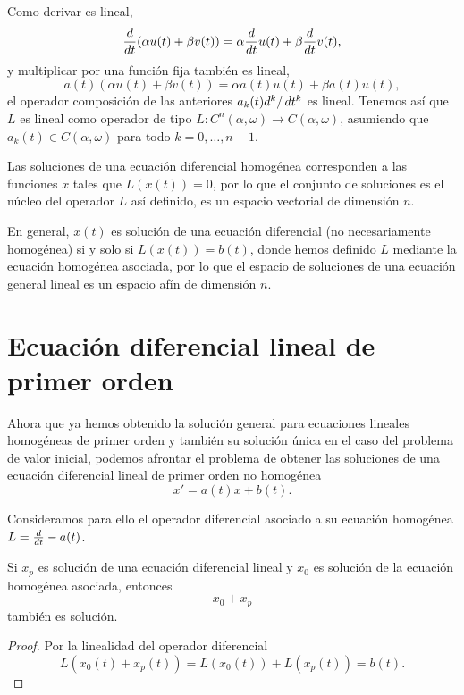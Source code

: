 \documentclass[../ecuaciones_diferenciales.tex]{subfiles}
\begin{document}
Como derivar es lineal,
\[\frac{d}{\mathop{d\!} t} (\alpha u(t) + \beta v(t))
	= \alpha \frac{d}{\mathop{d\!} t} u(t) + \beta \frac{d}{\mathop{d\!} t} v(t),\]
y multiplicar por una función fija también es lineal,
\[a(t)(\alpha u(t) + \beta v(t)) = \alpha a(t) u(t) + \beta a(t) u(t),\]
el operador composición de las anteriores \(a_k(t) d^k/\mathop{d\!} t^k\) es
lineal. Tenemos así que \(L\) es lineal como operador de tipo
\(L : C^n(\alpha, \omega) \to C(\alpha, \omega)\), asumiendo que
\(a_k(t) \in C(\alpha, \omega)\) para todo \(k=0, \dots, n-1\).

\begin{remark}
	Las soluciones de una ecuación diferencial homogénea corresponden a las
    funciones \(x\) tales que \(L(x(t)) = 0\), por lo que el conjunto de
    soluciones es el núcleo del operador \(L\) así definido, es un espacio
    vectorial de dimensión \(n\).
\end{remark}

\begin{remark}
	En general, \(x(t)\) es solución de una ecuación diferencial (no
    necesariamente homogénea) si y solo si \(L(x(t)) = b(t)\), donde hemos
    definido \(L\) mediante la ecuación homogénea asociada, por lo que el
    espacio de soluciones de una ecuación general lineal es un espacio afín de
    dimensión \(n\).
\end{remark}

\section{Ecuación diferencial lineal de primer orden}

Ahora que ya hemos obtenido la solución general para
ecuaciones lineales homogéneas de primer orden y también su solución única en el
caso del problema de valor inicial, podemos afrontar el
problema de obtener las soluciones de una ecuación diferencial lineal de primer
orden no homogénea
\[x' = a(t)x + b(t).\]

Consideramos para ello el operador diferencial asociado a su ecuación homogénea
\(L = \frac{d}{\mathop{d\!} t} - a(t)\).

\begin{lemma}
	Si \(x_p\) es solución de una ecuación diferencial lineal y \(x_0\) es
	solución de la ecuación homogénea asociada, entonces \[x_0 + x_p\] también es
	solución.
\end{lemma}

\begin{proof}
	Por la linealidad del operador diferencial
	\[L(x_0(t) + x_p(t)) = L(x_0(t)) + L(x_p(t)) = b(t).\]
\end{proof}
\end{document}
